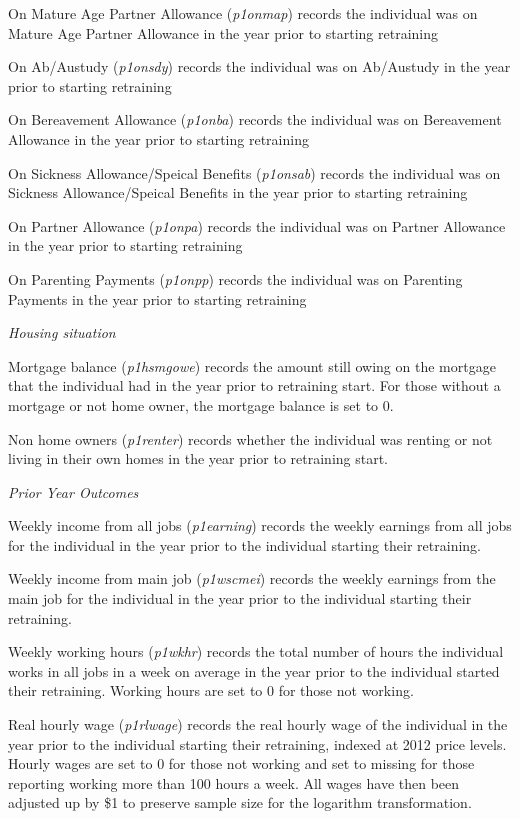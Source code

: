 \documentclass[12pt, a4paper]{article}
\begin{document}
On Mature Age Partner Allowance (\textit{p1\textunderscore{}onmap}) records the individual was on Mature Age Partner Allowance in the year prior to starting retraining

On Ab/Austudy (\textit{p1\textunderscore{}onsdy}) records the individual was on Ab/Austudy in the year prior to starting retraining

On Bereavement Allowance (\textit{p1\textunderscore{}onba}) records the individual was on Bereavement Allowance in the year prior to starting retraining

On Sickness Allowance/Speical Benefits (\textit{p1\textunderscore{}onsab}) records the individual was on Sickness Allowance/Speical Benefits in the year prior to starting retraining

On Partner Allowance (\textit{p1\textunderscore{}onpa}) records the individual was on Partner Allowance in the year prior to starting retraining

On Parenting Payments (\textit{p1\textunderscore{}onpp}) records the individual was on Parenting Payments in the year prior to starting retraining

\emph{Housing situation}

Mortgage balance (\textit{p1\textunderscore{}hsmgowe}) records the amount still owing on the mortgage that the individual had in the year prior to retraining start. For those without a mortgage or not home owner, the mortgage balance is set to 0. 

Non home owners (\textit{p1\textunderscore{}renter}) records whether the individual was renting or not living in their own homes in the year prior to retraining start.


\emph{Prior Year Outcomes}

Weekly income from all jobs (\textit{p1\textunderscore{}earning}) records the weekly earnings from all jobs for the individual in the year prior to the individual starting their retraining. 

Weekly income from main job (\textit{p1\textunderscore{}wscmei}) records the weekly earnings from the main job for the individual in the year prior to the individual starting their retraining.
 
Weekly working hours (\textit{p1\textunderscore{}wkhr}) records the total number of hours the individual works in all jobs in a week on average in the year prior to the individual started their retraining. Working hours are set to 0 for those not working. 

Real hourly wage (\textit{p1\textunderscore{}rlwage}) records the real hourly wage of the individual in the year prior to the individual starting their retraining, indexed at 2012 price levels. Hourly wages are set to 0 for those not working and set to missing for those reporting working more than 100 hours a week. All wages have then been adjusted up by \$1 to preserve sample size for the logarithm transformation. 
\end{document}
